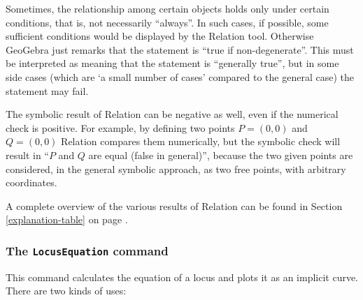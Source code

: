 \documentclass{article}
\begin{document}
Sometimes, the relationship among certain objects holds only under certain conditions, that is, not necessarily ``always''. In such cases, if possible, some sufficient conditions would be displayed by the Relation tool. Otherwise GeoGebra just remarks that the statement is ``true if non-degenerate''. This must be interpreted as meaning that the statement is ``generally true'', but in some side cases (which are `a small number of cases' compared to the general case) the statement may fail.

The symbolic result of Relation can be negative as well, even if the numerical check is positive. For example, by defining two points $P=(0,0)$ and $Q=(0,0)$ Relation compares them numerically, but the symbolic check will result in ``$P$ and $Q$ are equal (false in general)'', because the two given points are considered, in the general symbolic approach, as two free points, with arbitrary coordinates.

A complete overview of the various results of Relation can be found in Section \ref{explanation-table} on page \pageref{explanation-table}.

\subsubsection{The \texttt{LocusEquation} command}

This command calculates the equation of a locus and plots it as an implicit curve. There are two kinds of uses:
\end{document}
